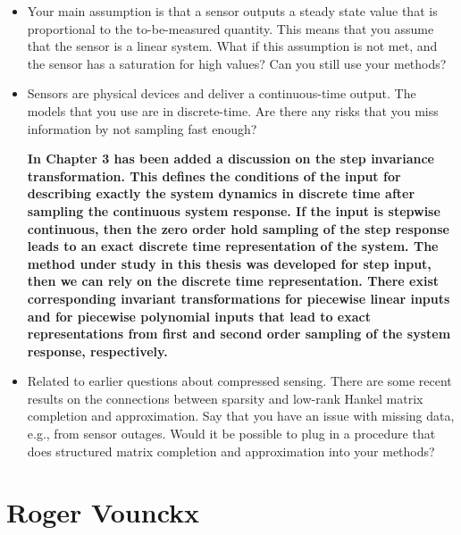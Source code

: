 \documentclass[11pt]{article}
\begin{document}
\begin{itemize}
	\item Your main assumption is that a sensor outputs a steady state value that is proportional to the to-be-measured quantity. This means that you assume that the sensor is a linear system. What if this assumption is not met, and the sensor has a saturation for high values? Can you still use your methods?
	\item  Sensors are physical devices and deliver a continuous-time output. The models that you use are in discrete-time. Are there any risks that you miss information by not sampling fast enough?
	
	{\bfseries In Chapter 3 has been added a discussion on the step invariance transformation. This defines the conditions of the input for describing exactly the system dynamics in discrete time after sampling the continuous system response. If the input is stepwise continuous, then the zero order hold sampling of the step response leads to an exact discrete time representation of the system. The method under study in this thesis was developed for step input, then we can rely on the discrete time representation. There exist corresponding invariant transformations for piecewise linear inputs and for piecewise polynomial inputs that lead to exact representations from first and second order sampling of the system response, respectively.  }
	
	\item  Related to earlier questions about compressed sensing. There are some recent results on the connections between sparsity and low-rank Hankel matrix completion and approximation. Say that you have an issue with missing data, e.g., from sensor outages. Would it be possible to plug in a procedure that does structured matrix completion and approximation into your methods?
\end{itemize}

\section*{Roger Vounckx}
\end{document}

